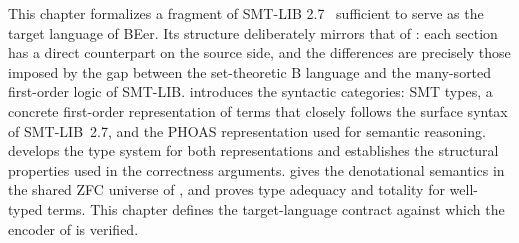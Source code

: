 \label{ch:smt}

This chapter formalizes a fragment of SMT-LIB 2.7~\cite{smtlib2.7} sufficient
to serve as the target language of BEer.
Its structure deliberately mirrors that of : each section has a direct
counterpart on the source side, and the differences are precisely those imposed by
the gap between the set-theoretic B language and the many-sorted first-order logic
of SMT-LIB.
 introduces the syntactic categories: SMT types, a concrete
first-order representation of terms that closely follows the surface syntax of
SMT-LIB~2.7, and the PHOAS representation used for semantic reasoning.
 develops the type system for both representations and
establishes the structural properties used in the correctness arguments.
 gives the denotational semantics in the shared ZFC
universe of , and proves type adequacy and totality for
well-typed terms.
This chapter defines the target-language contract against which the
encoder of  is verified.




% 
